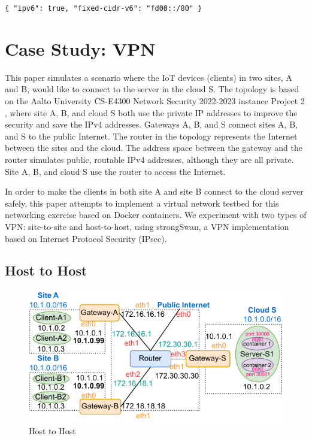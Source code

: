 \documentclass[article]{aaltoseries}
\begin{document}
\texttt{\{
  "ipv6": true,
  "fixed-cidr-v6": "fd00::/80"
\}}



\section{Case Study: VPN}

This paper simulates a scenario where the IoT devices (clients) in two sites, A and B, would like to connect to the server in the cloud S. The topology is based on the Aalto University CS-E4300 Network Security 2022-2023 instance Project 2 \cite{aura_peltonen_bui_2022}, where site A, B, and cloud S both use the private IP addresses to improve the security and save the IPv4 addresses. Gateways A, B, and S connect sites A, B, and S to the public Internet. The router in the topology represents the Internet between the sites and the cloud. The address space between the gateway and the router simulates public, routable IPv4 addresses, although they are all private. Site A, B, and cloud S use the router to access the Internet.

In order to make the clients in both site A and site B connect to the cloud server safely, this paper attempts to implement a virtual network testbed for this networking exercise based on Docker containers. We experiment with two types of VPN: site-to-site and host-to-host, using strongSwan, a VPN implementation based on Internet Protocol Security (IPsec).

\subsection{Host to Host}
\begin{figure}[t!]
  \begin{center}
    \includegraphics[scale=1]{figures/host-to-host.pdf}
    \caption{Host to Host}
    \label{fig:host2host}
  \end{center}
\end{figure}
\end{document}
